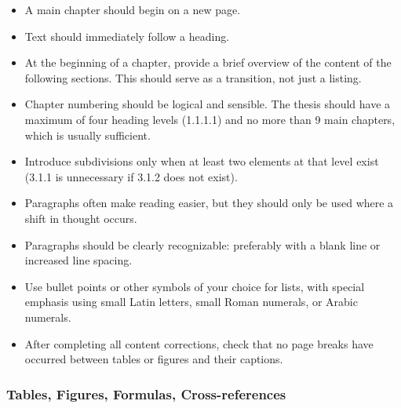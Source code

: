 \begin{itemize}
    \item A main chapter should begin on a new page.
    \item Text should immediately follow a heading.
    \item At the beginning of a chapter, provide a brief overview of the content of the following sections. This should serve as a transition, not just a listing.
    \item Chapter numbering should be logical and sensible. The thesis should have a maximum of four heading levels (1.1.1.1) and no more than 9 main chapters, which is usually sufficient.
    \item Introduce subdivisions only when at least two elements at that level exist (3.1.1 is unnecessary if 3.1.2 does not exist).
    \item Paragraphs often make reading easier, but they should only be used where a shift in thought occurs.
    \item Paragraphs should be clearly recognizable: preferably with a blank line or increased line spacing.
    \item Use bullet points or other symbols of your choice for lists, with special emphasis using small Latin letters, small Roman numerals, or Arabic numerals.
    \item After completing all content corrections, check that no page breaks have occurred between tables or figures and their captions.
\end{itemize}


\subsubsection{Tables, Figures, Formulas, Cross-references}
\label{sec:tables_figures_formulas_cross_references}

